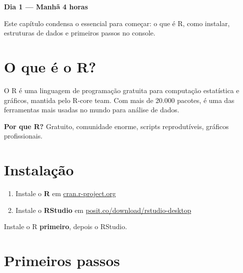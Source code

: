 \documentclass[
  letterpaper,
]{scrbook}
\providecommand{\tightlist}{%
  \setlength{\itemsep}{0pt}\setlength{\parskip}{0pt}}
\begin{document}
\textbf{Dia 1 --- Manhã \textbar{} 4 horas}

Este capítulo condensa o essencial para começar: o que é R, como
instalar, estruturas de dados e primeiros passos no console.

\section*{O que é o R?}\label{o-que-uxe9-o-r}


O R é uma linguagem de programação gratuita para computação estatística
e gráficos, mantida pelo R-core team. Com mais de 20.000 pacotes, é uma
das ferramentas mais usadas no mundo para análise de dados.

\textbf{Por que R?} Gratuito, comunidade enorme, scripts reprodutíveis,
gráficos profissionais.

\section*{Instalação}\label{instalauxe7uxe3o}


\begin{enumerate}
\def\labelenumi{\arabic{enumi}.}
\tightlist
\item
  Instale o \textbf{R} em
  \href{https://cran.r-project.org/}{cran.r-project.org}
\item
  Instale o \textbf{RStudio} em
  \href{https://posit.co/download/rstudio-desktop/}{posit.co/download/rstudio-desktop}
\end{enumerate}

\begin{tcolorbox}[enhanced jigsaw, arc=.35mm, bottomrule=.15mm, bottomtitle=1mm, breakable, colback=white, colbacktitle=quarto-callout-warning-color!10!white, colframe=quarto-callout-warning-color-frame, coltitle=black, left=2mm, leftrule=.75mm, opacityback=0, opacitybacktitle=0.6, rightrule=.15mm, title=\textcolor{quarto-callout-warning-color}{\faExclamationTriangle}\hspace{0.5em}{Warning}, titlerule=0mm, toprule=.15mm, toptitle=1mm]

Instale o R \textbf{primeiro}, depois o RStudio.

\end{tcolorbox}

\section*{Primeiros passos}\label{primeiros-passos}
\end{document}
